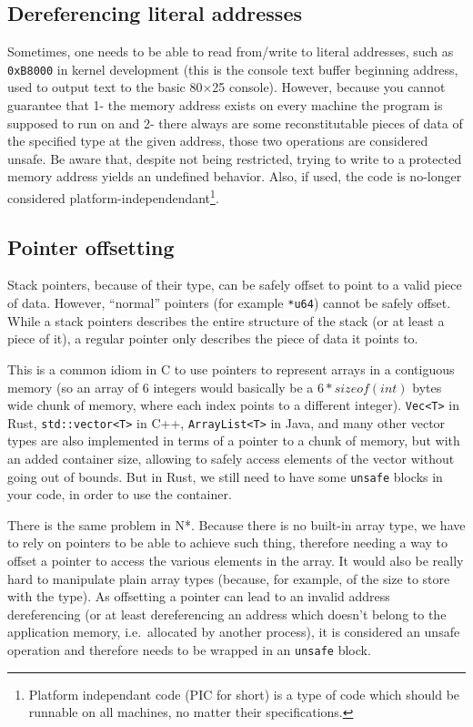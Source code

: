 \subsection{Dereferencing literal addresses}\label{subsec:nstar-common-unsafe-derefliteraladdr}

Sometimes, one needs to be able to read from/write to literal addresses, such as \texttt{0xB8000} in kernel development (this is the console text buffer beginning address, used to output text to the basic 80×25 console).
However, because you cannot guarantee that 1- the memory address exists on every machine the program is supposed to run on and 2- there always are some reconstitutable pieces of data of the specified type at the given address, those two operations are considered unsafe.
Be aware that, despite not being restricted, trying to write to a protected memory address yields an undefined behavior.
Also, if used, the code is no-longer considered platform-independendant\footnote{Platform independant code (PIC for short) is a type of code which should be runnable on all machines, no matter their specifications.}.

\subsection{Pointer offsetting}\label{subsec:nstar-common-unsafe-ptroffset}

Stack pointers, because of their type, can be safely offset to point to a valid piece of data.
However, ``normal'' pointers (for example \texttt{*u64}) cannot be safely offset.
While a stack pointers describes the entire structure of the stack (or at least a piece of it), a regular pointer only describes the piece of data it points to.

This is a common idiom in C to use pointers to represent arrays in a contiguous memory (so an array of 6 integers would basically be a $6 * sizeof(int)$ bytes wide chunk of memory, where each index points to a different integer).
\texttt{Vec<T>} in Rust, \texttt{std::vector<T>} in C++, \texttt{ArrayList<T>} in Java, and many other vector types are also implemented in terms of a pointer to a chunk of memory, but with an added container size, allowing to safely access elements of the vector without going out of bounds.
But in Rust, we still need to have some \texttt{unsafe} blocks in your code, in order to use the container.

There is the same problem in N*.
Because there is no built-in array type, we have to rely on pointers to be able to achieve such thing, therefore needing a way to offset a pointer to access the various elements in the array.
It would also be really hard to manipulate plain array types (because, for example, of the size to store with the type).
As offsetting a pointer can lead to an invalid address dereferencing (or at least dereferencing an address which doesn't belong to the application memory, i.e.\ allocated by another process), it is considered an unsafe operation and therefore needs to be wrapped in an \texttt{unsafe} block.

